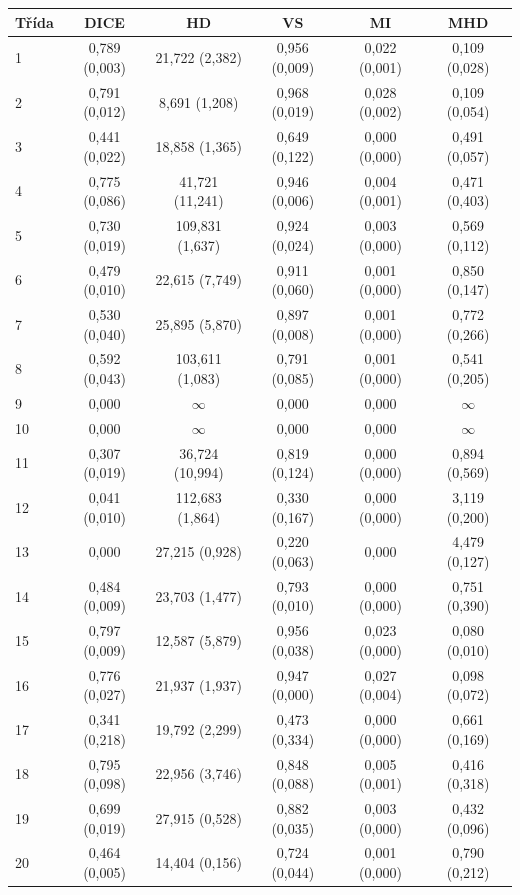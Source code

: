 \begin{tabular}{l c c c c c}
 \hline
Třída & DICE & HD & VS & MI & MHD \\ \hline
1 & 0,789 (0,003) & 21,722 (2,382) & 0,956 (0,009) & 0,022 (0,001) & 0,109 (0,028) \\
2 & 0,791 (0,012) & 8,691 (1,208) & 0,968 (0,019) & 0,028 (0,002) & 0,109 (0,054) \\
3 & 0,441 (0,022) & 18,858 (1,365) & 0,649 (0,122) & 0,000 (0,000) & 0,491 (0,057) \\
4 & 0,775 (0,086) & 41,721 (11,241) & 0,946 (0,006) & 0,004 (0,001) & 0,471 (0,403) \\
5 & 0,730 (0,019) & 109,831 (1,637) & 0,924 (0,024) & 0,003 (0,000) & 0,569 (0,112) \\
6 & 0,479 (0,010) & 22,615 (7,749) & 0,911 (0,060) & 0,001 (0,000) & 0,850 (0,147) \\
7 & 0,530 (0,040) & 25,895 (5,870) & 0,897 (0,008) & 0,001 (0,000) & 0,772 (0,266) \\
8 & 0,592 (0,043) & 103,611 (1,083) & 0,791 (0,085) & 0,001 (0,000) & 0,541 (0,205) \\
9 & 0,000 & $\infty$ & 0,000 & 0,000 & $\infty$ \\
10 & 0,000 & $\infty$ & 0,000 & 0,000 & $\infty$ \\
11 & 0,307 (0,019) & 36,724 (10,994) & 0,819 (0,124) & 0,000 (0,000) & 0,894 (0,569) \\
12 & 0,041 (0,010) & 112,683 (1,864) & 0,330 (0,167) & 0,000 (0,000) & 3,119 (0,200) \\
13 & 0,000 & 27,215 (0,928) & 0,220 (0,063) & 0,000 & 4,479 (0,127) \\
14 & 0,484 (0,009) & 23,703 (1,477) & 0,793 (0,010) & 0,000 (0,000) & 0,751 (0,390) \\
15 & 0,797 (0,009) & 12,587 (5,879) & 0,956 (0,038) & 0,023 (0,000) & 0,080 (0,010) \\
16 & 0,776 (0,027) & 21,937 (1,937) & 0,947 (0,000) & 0,027 (0,004) & 0,098 (0,072) \\
17 & 0,341 (0,218) & 19,792 (2,299) & 0,473 (0,334) & 0,000 (0,000) & 0,661 (0,169) \\
18 & 0,795 (0,098) & 22,956 (3,746) & 0,848 (0,088) & 0,005 (0,001) & 0,416 (0,318) \\
19 & 0,699 (0,019) & 27,915 (0,528) & 0,882 (0,035) & 0,003 (0,000) & 0,432 (0,096) \\
20 & 0,464 (0,005) & 14,404 (0,156) & 0,724 (0,044) & 0,001 (0,000) & 0,790 (0,212) \\

\end{tabular}
